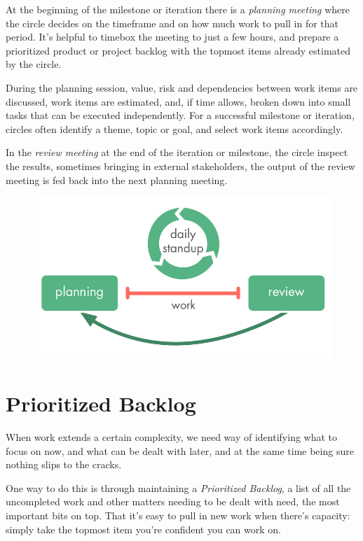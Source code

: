 At the beginning of the milestone or iteration there is a \emph{planning meeting} where the circle decides on the timeframe and on how much work to pull in for that period. It's helpful to timebox the meeting to just a few hours, and prepare a prioritized product or project backlog with the topmost items already estimated by the circle.

During the planning session, value, risk and dependencies between work items are discussed, work items are estimated, and, if time allows, broken down into small tasks that can be executed independently. For a successful milestone or iteration, circles often identify a theme, topic or goal, and select work items accordingly.

In the \emph{review meeting} at the end of the iteration or milestone, the circle inspect the results,
sometimes bringing in external stakeholders, the output of the review meeting is fed back into the next planning meeting.

\begin{figure}[htbp]
\centering
\includegraphics[keepaspectratio,width=\textwidth,height=0.75\textheight]{img/meetings/planning-review-standup.png}
\end{figure}

\section{Prioritized Backlog}
\label{prioritizedbacklog}

When work extends a certain complexity, we need way of identifying what to focus on now, and what can be dealt with later, and at the same time being sure nothing slips to the cracks.

One way to do this is through maintaining a \emph{Prioritized Backlog}, a list of all the uncompleted work and other matters needing to be dealt with need, the most important bits on top. That it's easy to pull in new work when there's capacity: simply take the topmost item you're confident you can work on.


